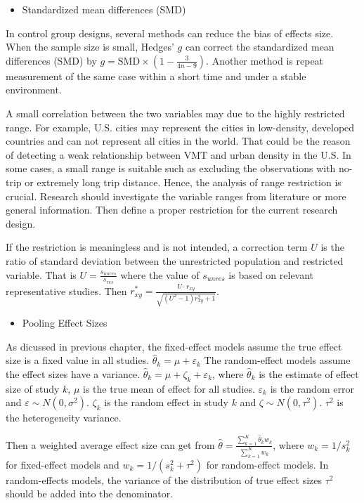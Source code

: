 \documentclass[
  11pt,
  openany]{memoir}
\providecommand{\tightlist}{%
  \setlength{\itemsep}{0pt}\setlength{\parskip}{0pt}}
\begin{document}
\begin{itemize}
\tightlist
\item
  Standardized mean differences (SMD)
\end{itemize}

In control group designs, several methods can reduce the bias of effects size.
When the sample size is small, Hedges' \(g\) can correct the standardized mean differences (SMD) by \(g = \text{SMD} \times (1-\frac{3}{4n-9})\).
Another method is repeat measurement of the same case within a short time and under a stable environment.

A small correlation between the two variables may due to the highly restricted range.
For example, U.S. cities may represent the cities in low-density, developed countries and can not represent all cities in the world.
That could be the reason of detecting a weak relationship between VMT and urban density in the U.S.
In some cases, a small range is suitable such as excluding the observations with no-trip or extremely long trip distance.
Hence, the analysis of range restriction is crucial.
Research should investigate the variable ranges from literature or more general information.
Then define a proper restriction for the current research design.

If the restriction is meaningless and is not intended, a correction term \(U\) is the ratio of standard deviation between the unrestricted population and restricted variable.
That is \(U= \frac{s_{unres}}{s_{res}}\) where the value of \(s_{unres}\) is based on relevant representative studies.
Then \(r^*_{xy} = \frac{U\cdot r_{xy}}{\sqrt{(U^2-1)r_{xy}^2+1}}\).

\begin{itemize}
\tightlist
\item
  Pooling Effect Sizes
\end{itemize}

As dicussed in previous chapter, the fixed-effect models assume the true effect size is a fixed value in all studies.
\(\hat\theta_k = \mu + \varepsilon_k\) The random-effect models assume the effect sizes have a variance.
\(\hat\theta_k = \mu + \zeta_k + \varepsilon_k\), where \(\hat\theta_k\) is the estimate of effect size of study \(k\), \(\mu\) is the true mean of effect for all studies.
\(\varepsilon_k\) is the random error and \(\varepsilon\sim N(0,\sigma^2)\).
\(\zeta_k\) is the random effect in study \(k\) and \(\zeta\sim N(0,\tau^2)\).
\(\tau^2\) is the heterogeneity variance.

Then a weighted average effect size can get from \(\hat\theta = \frac{\sum^{K}_{k=1} \hat\theta_kw_k}{\sum^{K}_{k=1} w_k}\), where \(w_k = 1/s^2_k\) for fixed-effect models and \(w_k = 1/(s^2_k+\tau^2)\) for random-effect models.
In random-effects models, the variance of the distribution of true effect sizes \(\tau^2\) should be added into the denominator.
\end{document}
